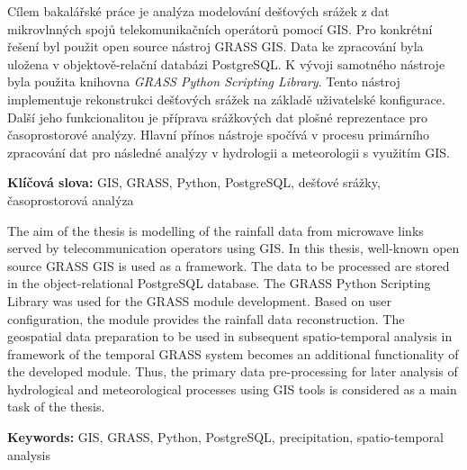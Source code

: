 \documentclass[a4paper,12pt,oneside]{report}
\author{Matěj Krejčí}
\newenvironment{abstractpage}
  {\cleardoublepage\vspace*{\fill}\thispagestyle{empty}}
  {\vfill\cleardoublepage}
\newenvironment{abstractx}[1]
  {\bigskip\selectlanguage{#1}%
   \begin{center}\bfseries\abstractname\end{center}}
  {\par\bigskip}
\newcommand{\klicslova}[2]{\noindent\textbf{#1: }#2}
\begin{document}
\pagestyle{empty}




\renewcommand{\bibname}{Literatura}
\renewcommand{\contentsname}{Obsah}
\renewcommand{\figurename}{Obr.}
\renewcommand{\tablename}{Tab.}




\renewcommand\footnotelayout{\footnotesize}



\newpage


\begin{abstractpage}
\begin{abstractx}{czech}

  Cílem bakalářské práce je analýza modelování dešťových srážek z dat
  mikrovlnných spojů telekomunikačních operátorů pomocí GIS. Pro
  konkrétní řešení byl použit open source nástroj GRASS GIS. Data ke
  zpracování byla uložena v objektově-relační databázi PostgreSQL. K
  vývoji samotného nástroje byla použita knihovna \textit{GRASS Python
    Scripting Library}. Tento nástroj implementuje rekonstrukci
  dešťových srážek na základě uživatelské konfigurace. Další jeho
  funkcionalitou je příprava srážkových dat plošné reprezentace pro
  časoprostorové analýzy. Hlavní přínos nástroje spočívá v procesu
  primárního zpracování dat pro následné analýzy v hydrologii a
  meteorologii s využitím GIS.


  \klicslova{Klíčová slova}{GIS, GRASS, Python, PostgreSQL,
    dešťové srážky, \newline časoprostorová analýza}
\end{abstractx}

\begin{abstractx}{english}

  The aim of the thesis is modelling of the rainfall data from
  microwave links served by telecommunication operators using GIS. In
  this thesis, well-known open source GRASS GIS is used as a
  framework. The data to be processed are stored in the
  object-relational PostgreSQL database. The GRASS Python Scripting
  Library was used for the GRASS module development. Based on user
  configuration, the module provides the rainfall data
  reconstruction. The geospatial data preparation to be used in
  subsequent spatio-temporal analysis in framework of the temporal
  GRASS system becomes an additional functionality of the developed
  module. Thus, the primary data pre-processing for later analysis of
  hydrological and meteorological processes using GIS tools is
  considered as a main task of the thesis.

  \klicslova{Keywords}{GIS, GRASS, Python, PostgreSQL,
    precipitation, spatio-temporal analysis}
\end{abstractx}
\end{abstractpage}
\end{document}

